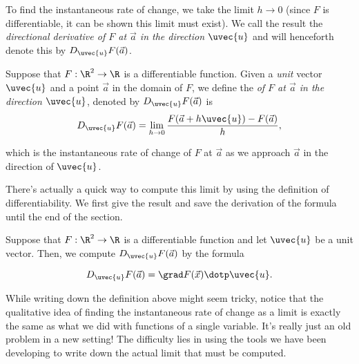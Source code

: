 \documentclass{ximera}
\begin{document}
To find the instantaneous rate of change, we take the limit $h \to 0$ (since $F$ is differentiable, it can be shown this limit must exist).  We call the result the \emph{directional derivative of $F$ at $\vec{a}$ in the direction $\uvec{u}$} and will henceforth denote this by $D_{\uvec{u}}F(\vec{a})$.  

\begin{definition}
  Suppose that $F: \R^2 \to \R$ is a differentiable function.  Given a \emph{unit} vector $\uvec{u}$ and a point $\vec{a}$ in the domain of $F$, we define the  \emph{ of $F$ at $\vec{a}$ in the direction $\uvec{u}$}, denoted by $D_{\uvec{u}} F(\vec{a})$ is
  \[
  D_\uvec{u}F(\vec{a}) = \lim_{h \to 0} \frac{F(\vec{a}+h\uvec{u})-F(\vec{a})}{h},
  \]
  
which is the instantaneous rate of change of $F$ at $\vec{a}$ as we approach $\vec{a}$ in the direction of $\uvec{u}$.
  \end{definition}
  
  There's actually a quick way to compute this limit by using the definition of differentiability.  We first give the result and save the derivation of the formula until the end of the section.
  
\begin{theorem}
 Suppose that $F: \R^2 \to \R$ is a differentiable function and let $\uvec{u}$ be a unit vector.   Then, we compute $D_{\uvec{u}}F(\vec{a})$ by the formula
 
\[
  D_\uvec{u}F(\vec{a}) = \grad F(\vec{x})\dotp \uvec{u}.
\]
\end{theorem}


\begin{remark}
While writing down the definition above might seem tricky, notice that the qualitative idea of finding the instantaneous rate of change as a limit is exactly the same as what we did with functions of a single variable.  It's really just an old problem in a new setting!  The difficulty lies in using the tools we have been developing to write down the actual limit that must be computed.
\end{remark}


\end{document}
